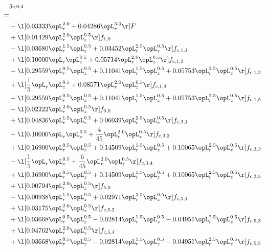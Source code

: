 \begin{alignat}{2} 
\label{eq:g_04_0} 
& g_{c,0,4} \nonumber \\ 
 = \\ 
& - \l[  0.03333 \opL_r^{2.0} +  0.04286 \opL_r^{3.0}  \r] F \nonumber \\ 
& + \l[  0.01429 \opL_r^{2.0} \opL_z^{0.5}  \r] f_{1,0} \nonumber \\ 
& - \l[  0.03680 \opL_r^{1.5} \opL_z^{0.5} +  0.03452 \opL_r^{2.5} \opL_z^{0.5}  \r] f_{c,1,1} \nonumber \\ 
& + \l[  0.10000 \opL_r \opL_z^{0.5} +  0.05714 \opL_r^{2.0} \opL_z^{0.5}  \r] f_{c,1,2} \nonumber \\ 
& - \l[  0.29559 \opL_r^{0.5} \opL_z^{0.5} +  0.11041 \opL_r^{1.5} \opL_z^{0.5} +  0.05753 \opL_r^{2.5} \opL_z^{0.5}  \r] f_{c,1,3} \nonumber \\ 
& + \l[ \frac{1}{5} \opL_r \opL_z^{0.5} +  0.08571 \opL_r^{2.0} \opL_z^{0.5}  \r] f_{c,1,4} \nonumber \\ 
& - \l[  0.29559 \opL_r^{0.5} \opL_z^{0.5} +  0.11041 \opL_r^{1.5} \opL_z^{0.5} +  0.05753 \opL_r^{2.5} \opL_z^{0.5}  \r] f_{c,1,5} \nonumber \\ 
& - \l[  0.02222 \opL_r^{2.0} \opL_z^{0.5}  \r] f_{3,0} \nonumber \\ 
& + \l[  0.04836 \opL_r^{1.5} \opL_z^{0.5} +  0.06039 \opL_r^{2.5} \opL_z^{0.5}  \r] f_{c,3,1} \nonumber \\ 
& - \l[  0.10000 \opL_r \opL_z^{0.5} + \frac{4}{45} \opL_r^{2.0} \opL_z^{0.5}  \r] f_{c,3,2} \nonumber \\ 
& + \l[  0.16900 \opL_r^{0.5} \opL_z^{0.5} +  0.14509 \opL_r^{1.5} \opL_z^{0.5} +  0.10065 \opL_r^{2.5} \opL_z^{0.5}  \r] f_{c,3,3} \nonumber \\ 
& - \l[ \frac{1}{5} \opL_r \opL_z^{0.5} + \frac{6}{45} \opL_r^{2.0} \opL_z^{0.5}  \r] f_{c,3,4} \nonumber \\ 
& + \l[  0.16900 \opL_r^{0.5} \opL_z^{0.5} +  0.14509 \opL_r^{1.5} \opL_z^{0.5} +  0.10065 \opL_r^{2.5} \opL_z^{0.5}  \r] f_{c,3,5} \nonumber \\ 
& + \l[  0.00794 \opL_r^{2.0} \opL_z^{0.5}  \r] f_{5,0} \nonumber \\ 
& - \l[  0.00938 \opL_r^{1.5} \opL_z^{0.5} +  0.02971 \opL_r^{2.5} \opL_z^{0.5}  \r] f_{c,5,1} \nonumber \\ 
& + \l[  0.03175 \opL_r^{2.0} \opL_z^{0.5}  \r] f_{c,5,2} \nonumber \\ 
& + \l[  0.03668 \opL_r^{0.5} \opL_z^{0.5}   -0.02814 \opL_r^{1.5} \opL_z^{0.5}   -0.04951 \opL_r^{2.5} \opL_z^{0.5}  \r] f_{c,5,3} \nonumber \\ 
& + \l[  0.04762 \opL_r^{2.0} \opL_z^{0.5}  \r] f_{c,5,4} \nonumber \\ 
& + \l[  0.03668 \opL_r^{0.5} \opL_z^{0.5}   -0.02814 \opL_r^{1.5} \opL_z^{0.5}   -0.04951 \opL_r^{2.5} \opL_z^{0.5}  \r] f_{c,5,5} \nonumber \\ 
\end{alignat} 


